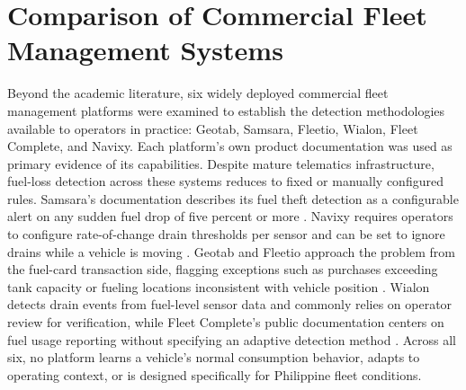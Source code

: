 \clearpage  %

\section{Comparison of Commercial Fleet Management Systems}

Beyond the academic literature, six widely deployed commercial fleet management platforms were examined to establish the detection methodologies available to operators in practice: Geotab, Samsara, Fleetio, Wialon, Fleet Complete, and Navixy. Each platform's own product documentation was used as primary evidence of its capabilities. Despite mature telematics infrastructure, fuel-loss detection across these systems reduces to fixed or manually configured rules. Samsara's documentation describes its fuel theft detection as a configurable alert on any sudden fuel drop of five percent or more \cite{samsara2026fuel_management}. Navixy requires operators to configure rate-of-change drain thresholds per sensor and can be set to ignore drains while a vehicle is moving \cite{navixy2026fuel_sensors}. Geotab and Fleetio approach the problem from the fuel-card transaction side, flagging exceptions such as purchases exceeding tank capacity or fueling locations inconsistent with vehicle position \cite{geotab2024fuel_management,fleetio2026fuel_management}. Wialon detects drain events from fuel-level sensor data and commonly relies on operator review for verification, while Fleet Complete's public documentation centers on fuel usage reporting without specifying an adaptive detection method \cite{fleetcomplete2026fuel}. Across all six, no platform learns a vehicle's normal consumption behavior, adapts to operating context, or is designed specifically for Philippine fleet conditions.

